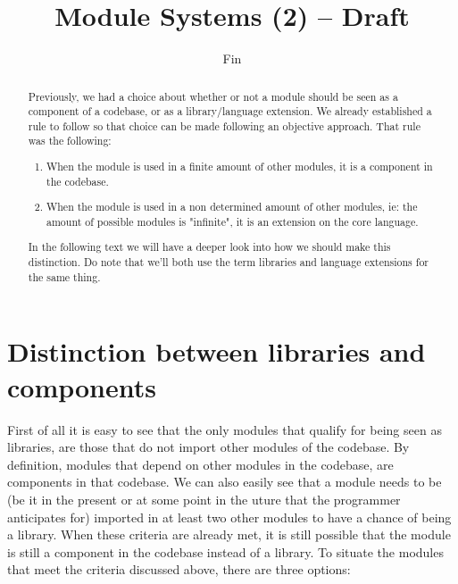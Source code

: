 \documentclass{article}
\title{Module Systems (2) -- Draft }
\author{Fin}
\begin{document}
\maketitle

\begin{abstract}
Previously, we had a choice about whether or not a module should be seen as a component of a codebase, or as a library/language extension.
We already established a rule to follow so that choice can be made following an objective approach. That rule was the following:

 \begin{enumerate}
        \item When the module is used in a finite amount of other modules, it is a component in the codebase.

        \item When the module is used in a non determined amount of  other modules, ie: the amount of possible modules is "infinite", it is an extension on the core language.
    
    \end{enumerate}
    
In the following text we will have a deeper look into how we should make this distinction.
Do note that we'll both use the term libraries and language extensions for the same thing.

\end{abstract}

\section{Distinction between libraries and components}

First of all it is easy to see that the only modules that qualify for being seen as libraries, are those that do not import other modules of the codebase. 
By definition, modules that depend on other modules in the codebase, are components in that codebase.
We can also easily see that a module needs to be (be it in the present or at some point in the uture that the programmer anticipates for) imported in at least two other modules to have a chance of being a library.
When these criteria are already met, it is still possible that the module is still a component in the codebase instead of a library.
To situate the modules that meet the criteria discussed above, there are three options:
\end{document}

